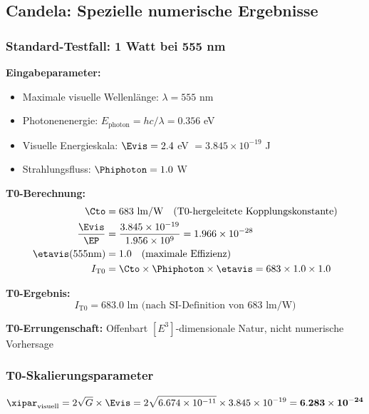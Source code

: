 	\subsection{Candela: Spezielle numerische Ergebnisse}
	\label{subsec:candela_numerische_ergebnisse}
	
	\subsubsection{Standard-Testfall: 1 Watt bei 555 nm}
	\label{subsubsec:candela_555nm_test}
	
	\textbf{Eingabeparameter:}
	\begin{itemize}
		\item Maximale visuelle Wellenlänge: $\lambda = 555$ nm
		\item Photonenenergie: $E_{\text{photon}} = hc/\lambda = 0.356$ eV
		\item Visuelle Energieskala: $\Evis = 2.4$ eV $= 3.845 \times 10^{-19}$ J
		\item Strahlungsfluss: $\Phiphoton = 1.0$ W
	\end{itemize}
	
	\textbf{T0-Berechnung:}
	\begin{align}
		\Cto &= 683 \text{ lm/W} \quad \text{(T0-hergeleitete Kopplungskonstante)} \\
		\frac{\Evis}{\EP} &= \frac{3.845 \times 10^{-19}}{1.956 \times 10^{9}} = 1.966 \times 10^{-28} \\
		\etavis(555\text{nm}) &= 1.0 \quad \text{(maximale Effizienz)} \\
		I_{\text{T0}} &= \Cto \times \Phiphoton \times \etavis = 683 \times 1.0 \times 1.0
	\end{align}
	
	\textbf{T0-Ergebnis:}
	\begin{equation}
		\boxed{I_{\text{T0}} = 683.0 \text{ lm (nach SI-Definition von 683 lm/W)}}
		\label{eq:candela_t0_ergebnis}
	\end{equation}
	
	\textbf{T0-Errungenschaft:} Offenbart $[E^3]$-dimensionale Natur, nicht numerische Vorhersage
	
	\subsubsection{T0-Skalierungsparameter}
	\label{subsubsec:candela_skalierungsparameter}
	
	\begin{equation}
		\xipar_{\text{visuell}} = 2\sqrt{G} \times \Evis = 2\sqrt{6.674 \times 10^{-11}} \times 3.845 \times 10^{-19} = \mathbf{6.283 \times 10^{-24}}
		\label{eq:xi_visuell_berechnet}
	\end{equation}
	

